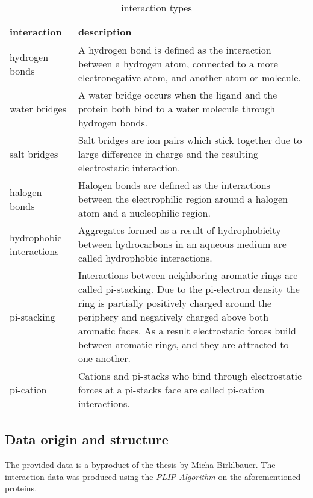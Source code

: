 \begin{table}[H]
    \centering
\begin{tabular}{ | m{10em} | m{30em}| } 
    \hline
    \textbf{interaction} &\textbf{description\cite[]{Birklbauer2021}}
    \\
    \hline
    hydrogen bonds& A hydrogen bond is defined as the interaction between a 
    hydrogen atom, connected to a more electronegative atom, and another atom or molecule. \\
    \hline
    water bridges   &A water bridge occurs when the ligand and the protein
    both bind to a water molecule through hydrogen bonds.\\
    \hline
    salt bridges&  Salt bridges are ion pairs which stick together due to
    large difference in charge and the resulting electrostatic interaction. \\
    \hline
    halogen bonds&  Halogen bonds are defined as the interactions between the electrophilic region
    around a halogen atom and a nucleophilic region.\\
    \hline
    hydrophobic interactions& Aggregates formed as a result
    of hydrophobicity between hydrocarbons in an 
    aqueous medium are called hydrophobic interactions.\\
    \hline
    pi-stacking   & Interactions between neighboring aromatic 
    rings are called pi-stacking. Due to the pi-electron density the ring is partially positively charged around 
    the periphery and negatively charged above both aromatic faces. As a result electrostatic forces build between aromatic rings,
     and they are attracted to one another.\\
    \hline
    pi-cation& Cations and pi-stacks who bind through electrostatic 
    forces at a pi-stacks face are called pi-cation interactions.\\
    \hline
   \end{tabular}
   \caption{interaction types}
\end{table}
    


\subsection{Data origin and structure} 
The provided data is a byproduct of the thesis \cite[]{Birklbauer2021} by Micha Birklbauer.
The interaction data was produced using the \textit{PLIP Algorithm} \cite[]{Salentin2015} 
on the aforementioned proteins.

